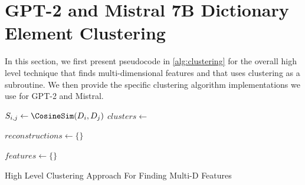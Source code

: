 \documentclass{article} %
\DeclareRobustCommand{\revFour}[1]{#1}
\theoremstyle{plain}
\theoremstyle{definition}
\begin{document}

\section{GPT-2 and Mistral 7B Dictionary Element Clustering}
\label{app:gpt2_and_mistral_sae_details}
\revFour{In this section, we first present pseudocode in \cref{alg:clustering} for the overall high level technique that finds multi-dimensional features and that uses clustering as a subroutine. We then provide the specific clustering algorithm implementations we use for GPT-2 and Mistral.}

\begin{algorithm}[H]
\label{alg:clustering}
\SetAlgoLined
{}


$S_{i, j} \gets \CosineSim(D_i, D_j)$\;
$clusters \gets$ \;

$reconstructions \gets \{\}$\;
\For{$cluster$ in $clusters$}{
    $R_{cluster} \gets$ ids of dictionary elements in $cluster$\;
    \For{$\vx_{i,l}$ in $X_{i,l}$}{
        $encoding \gets \texttt{ReLU}(E \cdot \vx_{i, l})$\;
        \If{$\max (encoding[R_{cluster}]) > 0$}{
            $r \gets D[:, R_{cluster}] \cdot encoding$\;
            $reconstructions \gets reconstructions \cup \{r\}$\;
            }
    }
}

$features \gets \{\}$\;

\caption{High Level Clustering Approach For Finding Multi-D Features}
\end{algorithm}
\end{document}
